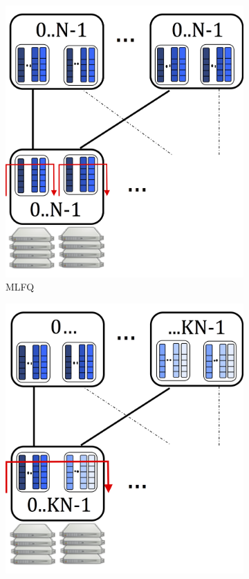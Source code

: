 \begin{figure}
	\centering
	\begin{subfigure}[htpb]{0.3\textwidth}
		\centering
		\includegraphics[width=\textwidth]{Chapter2/Figures/mlfq}
		\caption{MLFQ}
		\label{fig:sd-key-idea-mlfq}
	\end{subfigure}
	\hspace{0.2\textwidth}%
	\begin{subfigure}[htpb]{0.3\textwidth}
		\centering
		\includegraphics[width=\textwidth]{Chapter2/Figures/sdmlfq}

\end{subfigure}
\end{figure}
